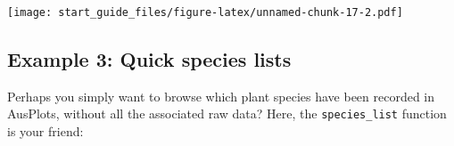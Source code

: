 \documentclass[
]{article}
\newenvironment{Shaded}{\begin{snugshade}}{\end{snugshade}}
\newcommand{\CommentTok}[1]{\textcolor[rgb]{0.56,0.35,0.01}{\textit{#1}}}
\begin{document}
\texttt{[image: start\_guide\_files/figure-latex/unnamed-chunk-17-2.pdf]}

\hypertarget{example-3-quick-species-lists}{%
\subsection{Example 3: Quick species
lists}\label{example-3-quick-species-lists}}

Perhaps you simply want to browse which plant species have been recorded
in AusPlots, without all the associated raw data? Here, the
\texttt{species\_list} function is your friend:

\begin{Shaded}
\end{Shaded}
\end{document}
